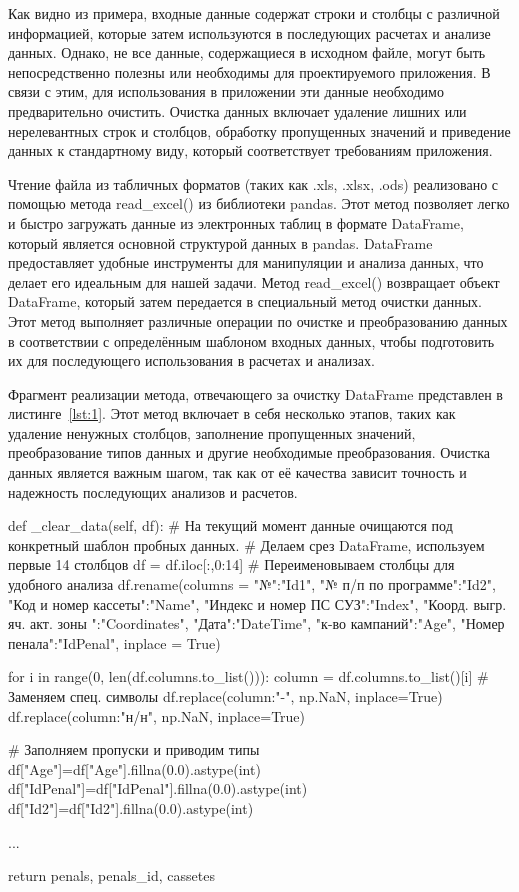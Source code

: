 Как видно из примера, входные данные содержат строки и столбцы с различной информацией, которые затем используются в последующих расчетах и анализе данных. Однако, не все данные, содержащиеся в исходном файле, могут быть непосредственно полезны или необходимы для проектируемого приложения. В связи с этим, для использования в приложении эти данные необходимо предварительно очистить. Очистка данных включает удаление лишних или нерелевантных строк и столбцов, обработку пропущенных значений и приведение данных к стандартному виду, который соответствует требованиям приложения.

Чтение файла из табличных форматов (таких как .xls, .xlsx, .ods) реализовано с помощью метода read\_excel() из библиотеки pandas. Этот метод позволяет легко и быстро загружать данные из электронных таблиц в формате DataFrame, который является основной структурой данных в pandas. DataFrame предоставляет удобные инструменты для манипуляции и анализа данных, что делает его идеальным для нашей задачи. Метод read\_excel() возвращает объект DataFrame, который затем передается в специальный метод очистки данных. Этот метод выполняет различные операции по очистке и преобразованию данных в соответствии с определённым шаблоном входных данных, чтобы подготовить их для последующего использования в расчетах и анализах. 

Фрагмент реализации метода, отвечающего за очистку DataFrame представлен в листинге~\ref{lst:1}. Этот метод включает в себя несколько этапов, таких как удаление ненужных столбцов, заполнение пропущенных значений, преобразование типов данных и другие необходимые преобразования. Очистка данных является важным шагом, так как от её качества зависит точность и надежность последующих анализов и расчетов.

\begin{flushleft}
 \label{lst:1}
\begin{MyCodes}
def _clear_data(self, df):
	# На текущий момент данные очищаются под конкретный шаблон пробных данных.
	# Делаем срез DataFrame, используем первые 14 столбцов
	df = df.iloc[:,0:14] 
	# Переименовываем столбцы для удобного анализа
	df.rename(columns = {
		"№":"Id1",
		"№ п/п по программе":"Id2",
		"Код  и номер кассеты":"Name",
		"Индекс и номер ПС СУЗ":"Index",
		"Коорд. выгр. яч. акт. зоны ":"Coordinates",
		"Дата":"DateTime",
		"к-во кампаний":"Age",
		"Номер пенала":"IdPenal"}, inplace = True)
	
	for i in range(0, len(df.columns.to_list())):
		column = df.columns.to_list()[i]
		# Заменяем спец. символы
		df.replace({column:"-"}, np.NaN, inplace=True) 
		df.replace({column:"н/н"}, np.NaN, inplace=True)
	
	# Заполняем пропуски и приводим типы
	df["Age"]=df["Age"].fillna(0.0).astype(int)
	df["IdPenal"]=df["IdPenal"].fillna(0.0).astype(int)
	df["Id2"]=df["Id2"].fillna(0.0).astype(int)
	
	...
	
	return penals, penals_id, cassetes

\end{MyCodes}
\end{flushleft}

